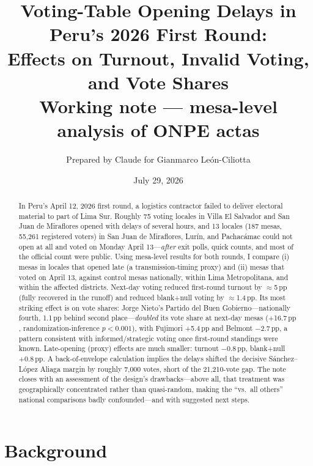 \documentclass[11pt]{article}
\title{\textbf{Voting-Table Opening Delays in Peru's 2026 First Round:\\ Effects on Turnout, Invalid Voting, and Vote Shares}\\[6pt]
\large Working note --- mesa-level analysis of ONPE actas}
\author{Prepared by Claude for Gianmarco León-Ciliotta}
\date{July 29, 2026}
\newcommand{\pp}{\,\text{pp}}
\begin{document}
\maketitle

\begin{abstract}
\noindent In Peru's April 12, 2026 first round, a logistics contractor failed to deliver electoral material to part of Lima Sur. Roughly 75 voting locales in Villa El Salvador and San Juan de Miraflores opened with delays of several hours, and 13 locales (187 mesas, 55,261 registered voters) in San Juan de Miraflores, Lurín, and Pachacámac could not open at all and voted on Monday April 13---\emph{after} exit polls, quick counts, and most of the official count were public. Using mesa-level results for both rounds, I compare (i) mesas in locales that opened late (a transmission-timing proxy) and (ii) mesas that voted on April 13, against control mesas nationally, within Lima Metropolitana, and within the affected districts. Next-day voting reduced first-round turnout by $\approx$5$\pp$ (fully recovered in the runoff) and reduced blank+null voting by $\approx$1.4$\pp$. Its most striking effect is on vote shares: Jorge Nieto's Partido del Buen Gobierno---nationally fourth, 1.1$\pp$ behind second place---\emph{doubled} its vote share at next-day mesas (+16.7$\pp$, randomization-inference $p<0.001$), with Fujimori +5.4$\pp$ and Belmont $-$2.7$\pp$, a pattern consistent with informed/strategic voting once first-round standings were known. Late-opening (proxy) effects are much smaller: turnout $-$0.8$\pp$, blank+null +0.8$\pp$. A back-of-envelope calculation implies the delays shifted the decisive S\'anchez--L\'opez Aliaga margin by roughly 7,000 votes, short of the 21,210-vote gap. The note closes with an assessment of the design's drawbacks---above all, that treatment was geographically concentrated rather than quasi-random, making the ``vs.\ all others'' national comparisons badly confounded---and with suggested next steps.
\end{abstract}

\section{Background}
\end{document}
